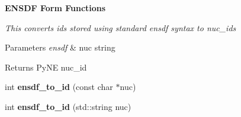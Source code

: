 \begin{Indent}\textbf{ E\+N\+S\+DF Form Functions}\par
{\em This converts id\textquotesingle{}s stored using standard ensdf syntax to nuc\+\_\+id\textquotesingle{}s 
\begin{DoxyParams}{Parameters}
{\em ensdf} & nuc string \\
\hline
\end{DoxyParams}
\begin{DoxyReturn}{Returns}
Py\+NE nuc\+\_\+id 
\end{DoxyReturn}
}\begin{DoxyCompactItemize}
\item 
\mbox{\label{namespacepyne_1_1nucname_addaba3a33cfa89a82f66c65f86975fdb}} 
int {\bfseries ensdf\+\_\+to\+\_\+id} (const char $\ast$nuc)
\item 
\mbox{\label{namespacepyne_1_1nucname_adb8e773bd38f51c6eb27af49b6285471}} 
int {\bfseries ensdf\+\_\+to\+\_\+id} (std\+::string nuc)
\end{DoxyCompactItemize}
\end{Indent}
